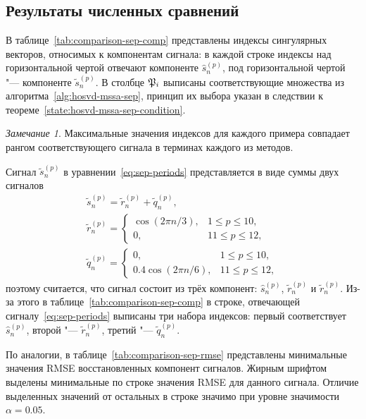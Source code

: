 \documentclass[specialist,
    substylefile = spbu.rtx,
    subf,href,colorlinks=true, 12pt]{disser}
\theoremstyle{plain}
\theoremstyle{definition}
\theoremstyle{remark}
\newtheorem*{remark}{Замечание}
\begin{document}
    \subsection{Результаты численных сравнений}\label{subsec:numerical-comp-sep}
    В таблице~\ref{tab:comparison-sep-comp} представлены индексы сингулярных векторов, относимых
    к компонентам сигнала: в каждой строке индексы над горизонтальной чертой отвечают компоненте $\hat{s}_n^{(p)}$,
    под горизонтальной чертой "--- компоненте $\tilde{s}_n^{(p)}$.
    В столбце $\mathfrak{P}_i$ выписаны соответствующие множества из алгоритма~\ref{alg:hosvd-mssa-sep},
    принцип их выбора указан в следствии к теореме~\ref{state:hosvd-mssa-sep-condition}.
    \begin{remark}
        Максимальные значения индексов для каждого примера совпадает рангом соответствующего сигнала в терминах
        каждого из методов.
    \end{remark}

    Сигнал $\tilde{s}_n^{(p)}$ в уравнении~\eqref{eq:sep-periods} представляется в виде суммы двух сигналов
    \begin{gather*}
        \tilde{s}_n^{(p)} = \tilde{r}_n^{(p)} + \tilde{q}_n^{(p)},\\
        \tilde{r}_n^{(p)} = \begin{cases}
            \cos(2\pi n /3), & 1 \leqslant p \leqslant 10,\\
            0, & 11 \leqslant p \leqslant 12,
        \end{cases} \\
        \tilde{q}_n^{(p)} = \begin{cases}
            0, & 1 \leqslant p \leqslant 10,\\
            0.4 \cos(2 \pi n / 6), & 11 \leqslant p \leqslant 12,
        \end{cases}
    \end{gather*}
    поэтому считается, что сигнал состоит из трёх компонент: $\hat{s}_n^{(p)}$, $\tilde{r}_n^{(p)}$ и
    $\tilde{r}_n^{(p)}$.
    Из-за этого в таблице~\ref{tab:comparison-sep-comp} в строке, отвечающей сигналу~\eqref{eq:sep-periods} выписаны
    три набора индексов: первый соответствует $\hat{s}_n^{(p)}$, второй "--- $\tilde{r}_n^{(p)}$,
    третий "--- $\tilde{q}_n^{(p)}$.

    По аналогии, в таблице~\ref{tab:comparison-sep-rmse} представлены минимальные значения RMSE восстановленных
    компонент сигналов.
    Жирным шрифтом выделены минимальные по строке значения RMSE для данного сигнала.
    Отличие выделенных значений от остальных в строке значимо при уровне значимости $\alpha=0.05$.
\end{document}
